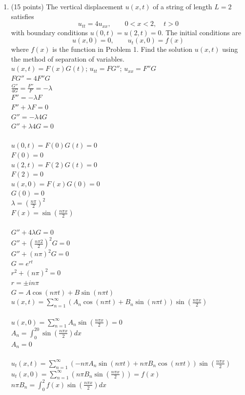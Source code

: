 \documentclass{article}
\begin{document}
\begin{enumerate}
\bigskip
\item (15 points)  The vertical displacement $u(x,t)$ of a string of length $L=2$ satisfies
\[
u_{tt}=4u_{xx},\qquad 0<x<2,\quad t>0
\]
with boundary conditions $u(0,t)=u(2,t)=0$.  The initial conditions are
\[
u(x,0)=0,\qquad u_t(x,0)=f(x)
\]
where $f(x)$ is the function in Problem 1.  Find the solution $u(x,t)$ using the method of separation of variables.
\\$u(x,t)=F(x)G(t)$; $u_{tt}=FG''$; $u_{xx}=F''G$
\\$FG''=4F''G$
\\$\frac{G''}{4G}=\frac{F''}{F}=-\lambda$
\\$F''=-\lambda F$
\\$F''+\lambda F=0$
\\$G''=-\lambda4G$
\\$G''+\lambda4G=0$
\\
\\$u(0,t)=F(0)G(t)=0$
\\$F(0)=0$
\\$u(2,t)=F(2)G(t)=0$
\\$F(2)=0$
\\$u(x,0)=F(x)G(0)=0$
\\$G(0)=0$
\\$\lambda=(\frac{n\pi}{2})^2$
\\$F(x)=\sin(\frac{n\pi x}{2})$
\\
\\$G''+4\lambda G=0$
\\$G''+(\frac{n\pi 2}{2})^2G=0$
\\$G''+(n\pi)^2G=0$
\\$G=e^{rt}$
\\$r^2+(n\pi)^2=0$
\\$r=\pm in\pi$
\\$G=A\cos(n\pi t)+B\sin(n\pi t)$
\\$u(x,t)=\sum_{n=1}^{\infty}(A_n\cos(n\pi t)+B_n\sin(n\pi t))\sin(\frac{n\pi x}{2})$
\\
\\$u(x,0)=\sum_{n=1}^{\infty}A_n\sin(\frac{n\pi x}{2})=0$
\\$A_n=\int_0^20\sin(\frac{n\pi x}{2})dx$
\\$A_n=0$
\\
\\$u_t(x,t)=\sum_{n=1}^{\infty}(-n\pi A_n\sin(n\pi t)+n\pi B_n\cos(n\pi t))\sin(\frac{n\pi x}{2})$
\\$u_t(x,0)=\sum_{n=1}^{\infty}(n\pi B_n\sin(\frac{n\pi x}{2}))=f(x)$
\\$n\pi B_n=\int_0^2f(x)\sin(\frac{n\pi x}{2})dx$

\end{enumerate}
\end{document}
